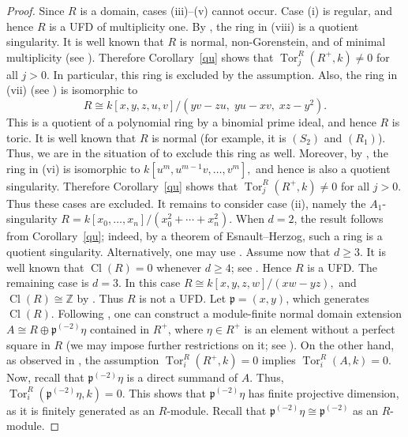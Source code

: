 \documentclass[11pt,a4paper]{amsart}
\numberwithin{equation}{section}
\theoremstyle{definition}
\theoremstyle{remark}
\begin{document}
\begin{proof}
Since \(R\) is a domain, cases (iii)--(v) cannot occur. Case (i) is regular, and hence \(R\) is a UFD of multiplicity one.
By \cite[Example 16.4]{lw}, the ring in (viii) is a quotient singularity. It is well known that \(R\) is normal, non-Gorenstein, and of minimal multiplicity (see \cite[Theorem 16.7]{lw}). Therefore Corollary~\ref{qu} shows that
	\(
	\operatorname{Tor}_j^R(R^+, k) \neq 0
	\)
for all \(j > 0\). In particular, this ring is excluded by the assumption.
	Also, the ring in (vii) (see \cite[Example 16.2]{lw}) is isomorphic to
	\[
	R \cong k[x, y, z, u, v]/(yv - zu,\; yu - xv,\; xz - y^2).
	\]
	This is a quotient of a polynomial ring by a binomial prime ideal, and hence \(R\) is toric. It is well known that \(R\) is normal (for example, it is \((S_2)\) and \((R_1)\)). Thus, we are in the situation of \cite[Theorem 1.1]{MP} to exclude this ring as well.
Moreover, by \cite[p.~291]{lw}, the ring in (vi) is isomorphic to
	\(
	k[u^m, u^{m-1}v, \ldots, v^m],
	\)
	and hence is also a quotient singularity. Therefore Corollary~\ref{qu} shows that
	\(
	\operatorname{Tor}_j^R(R^+, k) \neq 0
	\)
	for all \(j > 0\). Thus these cases are excluded.
It remains to consider case (ii), namely the \(A_1\)-singularity
	\(
	R = k[x_0, \ldots, x_n]/(x_0^2 + \cdots + x_n^2).
	\)
	When \(d = 2\), the result follows from Corollary~\ref{qu}; indeed, by a theorem of Esnault--Herzog, such a ring is a quotient singularity. Alternatively, one may use \cite[Theorem (A)]{p}.
Assume now that \(d \geqslant 3\). It is well known that
	\(
	\operatorname{Cl}(R) = 0
	\)
	whenever \(d \geqslant 4\); see \cite[Section 11]{f}. Hence \(R\) is a UFD.
The remaining case is \(d = 3\). In this case
	\(
	R \cong k[x, y, z, w]/(xw - yz),
	\)
	and
	\(
	\operatorname{Cl}(R) \cong \mathbb Z
	\)
	by \cite[11.3]{f}. Thus \(R\) is not a UFD.
	Let \(\mathfrak p = (x, y)\), which generates \(\operatorname{Cl}(R)\). Following \cite[Example 2]{Rob}, one can construct a module-finite normal domain extension
	\(
	A \cong R \oplus \mathfrak p^{(-2)}\eta
	\)
	contained in \(R^+\), where \(\eta \in R^+\) is an element without a perfect square in \(R\) (we may impose further restrictions on it; see \cite[Example 2]{Rob}).
	On the other hand, as observed in \cite{p}, the assumption
	\(
	\operatorname{Tor}_i^R(R^+, k) = 0
	\)
	implies
	\(
	\operatorname{Tor}_i^R(A, k) = 0.
	\)
	Now, recall that \(\mathfrak p^{(-2)}\eta\) is a direct summand of \(A\). Thus,
	\(
	\operatorname{Tor}_i^R(\mathfrak p^{(-2)}\eta, k) = 0.
	\)
	This shows that \(\mathfrak p^{(-2)}\eta\) has finite projective dimension, as it is finitely generated as an \(R\)-module. Recall that \(\mathfrak p^{(-2)}\eta \cong \mathfrak p^{(-2)}\) as an \(R\)-module.

\end{proof}
\end{document}
